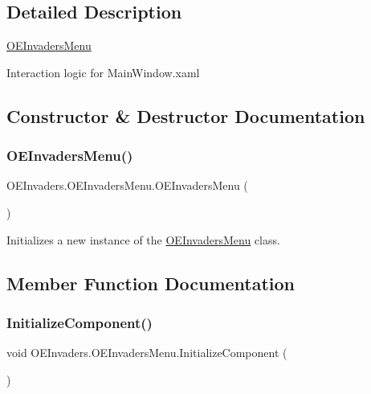 \subsection{Detailed Description}
\mbox{\hyperlink{class_o_e_invaders_1_1_o_e_invaders_menu}{O\+E\+Invaders\+Menu}} 

Interaction logic for Main\+Window.\+xaml

\subsection{Constructor \& Destructor Documentation}
\mbox{\label{class_o_e_invaders_1_1_o_e_invaders_menu_a8cfb53b3db4ed2d4626af2aa50614278}} 
\subsubsection{\texorpdfstring{OEInvadersMenu()}{OEInvadersMenu()}}
{\footnotesize\ttfamily O\+E\+Invaders.\+O\+E\+Invaders\+Menu.\+O\+E\+Invaders\+Menu (\begin{DoxyParamCaption}{ }\end{DoxyParamCaption})}



Initializes a new instance of the \mbox{\hyperlink{class_o_e_invaders_1_1_o_e_invaders_menu}{O\+E\+Invaders\+Menu}} class. 



\subsection{Member Function Documentation}
\mbox{\label{class_o_e_invaders_1_1_o_e_invaders_menu_ac37b8a5769d575b798377414a4836960}} 
\subsubsection{\texorpdfstring{InitializeComponent()}{InitializeComponent()}\hspace{0.1cm}{\footnotesize\ttfamily [1/2]}}
{\footnotesize\ttfamily void O\+E\+Invaders.\+O\+E\+Invaders\+Menu.\+Initialize\+Component (\begin{DoxyParamCaption}{ }\end{DoxyParamCaption})}



